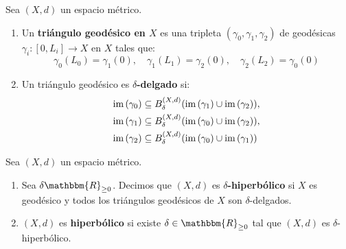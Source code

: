 \documentclass[12pt]{report}
\theoremstyle{largebreak}
\newcommand\cf[3]{\ensuremath{#1:#2\rightarrow#3}}
\newcommand{\bbm}[1]{\ensuremath{\mathbbm{#1}}}
\newcommand{\im}[1]{\ensuremath{\textup{im}\left(#1\right)}}
\begin{document}
    \begin{mydef}
        Sea $(X,d)$ un espacio métrico.
        \begin{enumerate}[label = \textit{\arabic*}]
            \item Un \textbf{triángulo geodésico en $X$} es una tripleta $(\gamma_0,\gamma_1,\gamma_2)$ de geodésicas $\cf{\gamma_i}{[0,L_i]}{X}$ en $X$ tales que:
            \begin{equation*}
                \gamma_0(L_0)=\gamma_1(0),\quad \gamma_1(L_1)=\gamma_2(0),\quad \gamma_2(L_2)=\gamma_0(0)
            \end{equation*}
            \item Un triángulo geodésico es \textbf{$\delta$-delgado} si:
            \begin{equation*}
                \begin{split}
                    \im{\gamma_0}&\subseteq B_{\delta}^{(X,d)}(\im{\gamma_1}\cup\im{\gamma_2}),\\
                    \im{\gamma_1}&\subseteq B_{\delta}^{(X,d)}(\im{\gamma_0}\cup\im{\gamma_2}),\\
                    \im{\gamma_2}&\subseteq B_{\delta}^{(X,d)}(\im{\gamma_0}\cup\im{\gamma_1})\\
                \end{split}
            \end{equation*}
        \end{enumerate}
    \end{mydef}

    \begin{exa}
    \end{exa}

    \begin{mydef}
        Sea $(X,d)$ un espacio métrico.
        \begin{enumerate}[label = \textit{(\arabic*)}]
            \item Sea $\delta\bbm{R}_{\geq0}$. Decimos que $(X,d)$ es \textbf{$\delta$-hiperbólico} si $X$ es geodésico y todos los triángulos geodésicos de $X$ son $\delta$-delgados.
            \item $(X,d)$ es \textbf{hiperbólico} si existe $\delta\in\bbm{R}_{\geq0}$ tal que $(X,d)$ es $\delta$-hiperbólico.
        \end{enumerate}
    \end{mydef}
\end{document}
